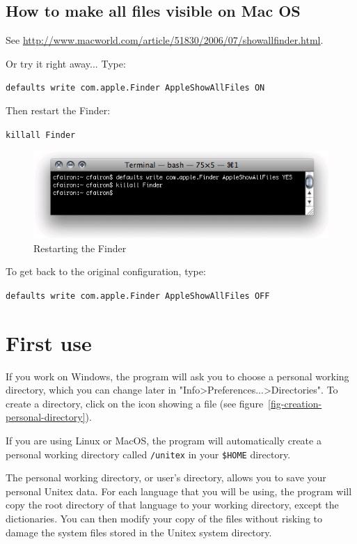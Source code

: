\subsection{How to make all files visible on Mac OS}
\noindent See
\url{http://www.macworld.com/article/51830/2006/07/showallfinder.html}.

\bigskip
\noindent Or try it right away... Type: 

\bigskip
\verb+defaults write com.apple.Finder AppleShowAllFiles ON+

\bigskip
\noindent Then restart the Finder:

\bigskip
\verb+killall Finder+

\begin{figure}[!h]
\begin{center}
\includegraphics[width=12cm]{resources/img/fig-mac6.png}
\caption{Restarting the Finder\label{fig-mac6}}
\end{center}
\end{figure}

\bigskip
\noindent To get back to the original configuration, type: 

\bigskip
\verb+defaults write com.apple.Finder AppleShowAllFiles OFF+


\section{First use}
If you work on Windows, the program will ask you to choose a
 personal working  directory, which you can
change later in "Info>Preferences...>Directories". To create a directory, click
on the icon showing a file (see
figure~\ref{fig-creation-personal-directory}).

\bigskip
\noindent If you are using Linux or MacOS, the program will automatically create a
personal working directory called \verb+/unitex+ in your \verb+$HOME+ directory.

\bigskip
\noindent The personal working directory, or user's directory, allows
you to save your personal Unitex data. For each language that you will be using, the
program will copy the root directory of that language to your working
directory, except the dictionaries. You can then modify your copy of the
files without risking to damage the system files stored in the
Unitex system directory.

